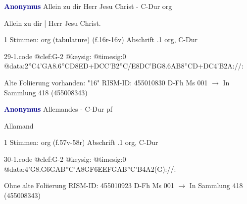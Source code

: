 \documentclass[twocolumn]{book}
\begin{document}
\newline \par \vspace{7pt} \textcolor{darkblue}{\textbf{Anonymus  }}
\newline Allein zu dir Herr Jesu Christ - C-Dur
\newline org
\newline \begin{itshape}[f.16r, at left:] Allein zu dir | Herr Jesu Christ.\end{itshape} 
\newline \textcolor{darkblue}{}  1 Stimmen: org (tabulature)  (f.16r-16v)
\newline Abschrift
.1  org, C-Dur  
\begin{filecontents*}{29-1.code}
@clef:G-2
@keysig:
@timesig:0
@data:2''C4'GA{8.6''CD8ED+}{DCC'B}2''C/E{8DC'BG}{8.6AB8''CD+}{DC}4'B2A://:
\end{filecontents*}
\newline
%
\newline Alte Foliierung vorhanden: "16"
\newline RISM-ID: 455010830
\newline D-Fh  Ms 001
\newline $\rightarrow$ In Sammlung 418 (455008343)
      
\newline \par \vspace{7pt} \textcolor{darkblue}{\textbf{Anonymus  }}
\newline Allemandes - C-Dur
\newline pf
\newline \begin{itshape}[f.57v, at left:] Allamand\end{itshape} 
\newline \textcolor{darkblue}{}  1 Stimmen: org  (f.57v-58r)
\newline Abschrift
.1  org, C-Dur  
\begin{filecontents*}{30-1.code}
@clef:G-2
@keysig:
@timesig:0
@data:4'G{8.G6G}{AB''C'A}{8GF}{6EEFG}{AB''C'B}4A2(G)://:
\end{filecontents*}
\newline
%
\newline Ohne alte Foliierung
\newline RISM-ID: 455010923
\newline D-Fh  Ms 001
\newline $\rightarrow$ In Sammlung 418 (455008343)
      
\end{document}
